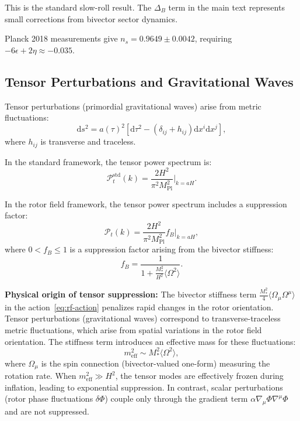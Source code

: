 \documentclass[11pt,a4paper]{article}
\numberwithin{equation}{section}
\theoremstyle{plain}
\theoremstyle{definition}
\theoremstyle{remark}
\newcommand{\dd}{\mathrm{d}}
\begin{document}
This is the standard slow-roll result. The $\Delta_B$ term in the main text represents small corrections from bivector sector dynamics.

Planck 2018 measurements give $n_s = 0.9649 \pm 0.0042$, requiring $-6\epsilon + 2\eta \approx -0.035$.

\subsection{Tensor Perturbations and Gravitational Waves}

Tensor perturbations (primordial gravitational waves) arise from metric fluctuations:
\begin{equation}
\dd s^2 = a(\tau)^2\left[\dd\tau^2 - (\delta_{ij} + h_{ij})\dd x^i\dd x^j\right],
\end{equation}
where $h_{ij}$ is transverse and traceless.

In the standard framework, the tensor power spectrum is:
\begin{equation}
\mathcal{P}_t^{\text{std}}(k) = \frac{2H^2}{\pi^2 M_{\mathrm{Pl}}^2}\Bigg|_{k=aH}.
\end{equation}

In the rotor field framework, the tensor power spectrum includes a suppression factor:
\begin{equation}
\mathcal{P}_t(k) = \frac{2H^2}{\pi^2 M_{\mathrm{Pl}}^2}f_B\Bigg|_{k=aH},
\label{eq:tensor-power}
\end{equation}
where $0 < f_B \leq 1$ is a suppression factor arising from the bivector stiffness:
\begin{equation}
f_B = \frac{1}{1 + \frac{M_*^2}{H^2}\langle \Omega^2 \rangle}.
\end{equation}

\textbf{Physical origin of tensor suppression:} The bivector stiffness term $\frac{M_*^2}{4}\langle \Omega_\mu \Omega^\mu \rangle$ in the action~\eqref{eq:rf-action} penalizes rapid changes in the rotor orientation. Tensor perturbations (gravitational waves) correspond to transverse-traceless metric fluctuations, which arise from spatial variations in the rotor field orientation. The stiffness term introduces an effective mass for these fluctuations:
\begin{equation}
m_{\text{eff}}^2 \sim M_*^2 \langle \Omega^2 \rangle,
\end{equation}
where $\Omega_\mu$ is the spin connection (bivector-valued one-form) measuring the rotation rate. When $m_{\text{eff}}^2 \gg H^2$, the tensor modes are effectively frozen during inflation, leading to exponential suppression. In contrast, scalar perturbations (rotor phase fluctuations $\delta\Phi$) couple only through the gradient term $\alpha \nabla_\mu \Phi \nabla^\mu \Phi$ and are not suppressed.
\end{document}
